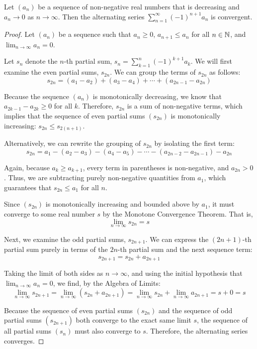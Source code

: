 \documentclass[../analysis1.tex]{subfiles}
\begin{document}
\begin{theorem}
\label{thm:alternatingseries}
    \begin{shaded*}
        Let $(a_n)$ be a sequence of non-negative real numbers that is decreasing and $a_n \to 0$ as $n \to \infty$. Then the alternating series $\sum_{n=1}^\infty (-1)^{n+1} a_n$ is convergent.
    \end{shaded*}
\end{theorem}
\begin{proof}
    Let $(a_n)$ be a sequence such that $a_n \ge 0$, $a_{n+1} \le a_n$ for all $n \in \mathbb{N}$, and $\lim_{n \to \infty} a_n = 0$.
        
    Let $s_n$ denote the $n$-th partial sum, $s_n = \sum_{k=1}^n (-1)^{k+1} a_k$. We will first examine the even partial sums, $s_{2n}$. We can group the terms of $s_{2n}$ as follows:
    \[ s_{2n} = (a_1 - a_2) + (a_3 - a_4) + \cdots + (a_{2n-1} - a_{2n}) \]
        
    Because the sequence $(a_n)$ is monotonically decreasing, we know that $a_{2k-1} - a_{2k} \ge 0$ for all $k$. Therefore, $s_{2n}$ is a sum of non-negative terms, which implies that the sequence of even partial sums $(s_{2n})$ is monotonically increasing: $s_{2n} \le s_{2(n+1)}$.
        
    Alternatively, we can rewrite the grouping of $s_{2n}$ by isolating the first term:
    \[ s_{2n} = a_1 - (a_2 - a_3) - (a_4 - a_5) - \cdots - (a_{2n-2} - a_{2n-1}) - a_{2n} \]
        
    Again, because $a_k \ge a_{k+1}$, every term in parentheses is non-negative, and $a_{2n} > 0$. Thus, we are subtracting purely non-negative quantities from $a_1$, which guarantees that $s_{2n} \le a_1$ for all $n$.
        
    Since $(s_{2n})$ is monotonically increasing and bounded above by $a_1$, it must converge to some real number $s$ by the Monotone Convergence Theorem. That is, 
    \[ \lim_{n \to \infty} s_{2n} = s \]
        
    Next, we examine the odd partial sums, $s_{2n+1}$. We can express the $(2n+1)$-th partial sum purely in terms of the $2n$-th partial sum and the next sequence term:
    \[ s_{2n+1} = s_{2n} + a_{2n+1} \]
        
    Taking the limit of both sides as $n \to \infty$, and using the initial hypothesis that $\lim_{n \to \infty} a_n = 0$, we find, by the Algebra of Limits:
    \[ \lim_{n \to \infty} s_{2n+1} = \lim_{n \to \infty} (s_{2n} + a_{2n+1}) = \lim_{n \to \infty} s_{2n} + \lim_{n \to \infty} a_{2n+1} = s + 0 = s \]
        
    Because the sequence of even partial sums $(s_{2n})$ and the sequence of odd partial sums $(s_{2n+1})$ both converge to the exact same limit $s$, the sequence of all partial sums $(s_n)$ must also converge to $s$. Therefore, the alternating series converges.\qedhere
\end{proof}
\end{document}

